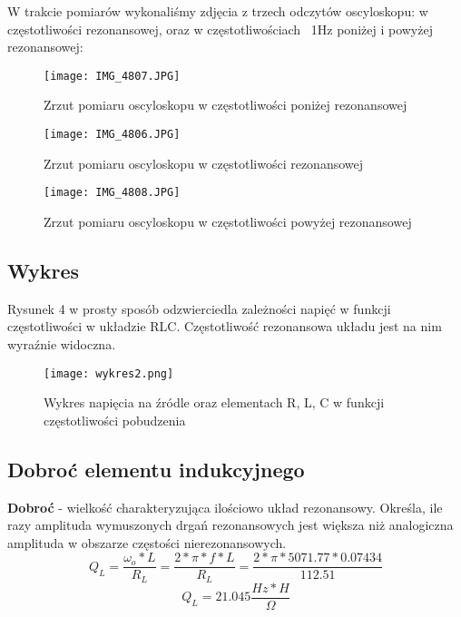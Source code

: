 \documentclass[polish,a4paper]{article}
\begin{document}
W trakcie pomiarów wykonaliśmy zdjęcia z trzech odczytów oscyloskopu: w częstotliwości rezonansowej, oraz w częstotliwościach ~1Hz poniżej i powyżej rezonansowej:
\begin{figure}[H]
\centering
\texttt{[image: IMG\_4807.JPG]}
\caption{Zrzut pomiaru oscyloskopu w częstotliwości poniżej rezonansowej}
\end{figure}

\begin{figure}[H]
\centering
\texttt{[image: IMG\_4806.JPG]}
\caption{Zrzut pomiaru oscyloskopu w częstotliwości rezonansowej}
\end{figure}

\begin{figure}[H]
\centering
\texttt{[image: IMG\_4808.JPG]}
\caption{Zrzut pomiaru oscyloskopu w częstotliwości powyżej rezonansowej}
\end{figure}

\subsection{Wykres}
Rysunek 4 w prosty sposób odzwierciedla zależności napięć w funkcji częstotliwości w układzie RLC. Częstotliwość rezonansowa układu jest na nim wyraźnie widoczna.
\begin{figure}[H]
\centering
\texttt{[image: wykres2.png]}
\caption{Wykres napięcia na źródle oraz elementach R, L, C w funkcji częstotliwości pobudzenia}
\end{figure}

\subsection{Dobroć elementu indukcyjnego}
{\bf Dobroć} -  wielkość charakteryzująca ilościowo układ rezonansowy. Określa, ile razy amplituda wymuszonych drgań rezonansowych jest większa niż analogiczna amplituda w obszarze częstości nierezonansowych.
$$Q_{L}=\frac{\omega_{o}*L}{R_{L}}=\frac{2*\pi*f*L}{R_{L}}=\frac{2*\pi*5071.77*0.07434}{112.51}$$
$$Q_{L}=21.045\frac{Hz*H}{\Omega}$$
\end{document}
